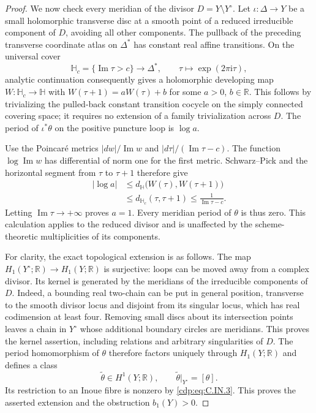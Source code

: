 \begin{proof}
We now check every meridian of the divisor
$D=Y\setminus Y^\circ$. Let $\iota:\Delta\to Y$ be a small
holomorphic transverse disc at a smooth point of a reduced
irreducible component of $D$, avoiding all other components.
The pullback of the preceding transverse coordinate atlas on
$\Delta^*$ has constant real affine transitions. On the universal
cover
\[
 \mathbb H_c=\{\operatorname{Im}\tau>c\}
 \longrightarrow\Delta^*,\qquad
 \tau\longmapsto\exp(2\pi\mathrm i\tau),
\]
analytic continuation consequently gives a holomorphic developing
map $W:\mathbb H_c\to\mathbb H$ with
$W(\tau+1)=aW(\tau)+b$ for some $a>0$, $b\in\mathbb R$.
This follows by trivializing the pulled-back constant transition
cocycle on the simply connected covering space; it requires no
extension of a family trivialization across $D$.
The period of $\iota^*\theta$ on the positive puncture loop is
$\log a$.

Use the Poincar\'e metrics
$|dw|/\operatorname{Im}w$ and
$|d\tau|/(\operatorname{Im}\tau-c)$.
The function $\log\operatorname{Im}w$ has differential of norm
one for the first metric. Schwarz--Pick and the horizontal segment
from $\tau$ to $\tau+1$ therefore give
\[
\begin{aligned}
 |\log a|
 &\le d_{\mathbb H}\bigl(W(\tau),W(\tau+1)\bigr)\\
 &\le d_{\mathbb H_c}(\tau,\tau+1)
 \le\frac{1}{\operatorname{Im}\tau-c}.
\end{aligned}
\tag{C.IN.5}\label{cdp:eq:C.IN.5}
\]
Letting $\operatorname{Im}\tau\to+\infty$ proves $a=1$.
Every meridian period of $\theta$ is thus zero. This calculation
applies to the reduced divisor and is unaffected by the
scheme-theoretic multiplicities of its components.

For clarity, the exact topological extension is as follows.
The map $H_1(Y^\circ;\mathbb R)\to H_1(Y;\mathbb R)$ is
surjective: loops can be moved away from a complex divisor.
Its kernel is generated by the meridians of the irreducible
components of $D$. Indeed, a bounding real two-chain can be put
in general position, transverse to the smooth divisor locus and
disjoint from its singular locus, which has real codimension at
least four. Removing small discs about its intersection points
leaves a chain in $Y^\circ$ whose additional boundary circles
are meridians. This proves the kernel assertion, including
relations and arbitrary singularities of $D$.
The period homomorphism of $\theta$ therefore factors uniquely
through $H_1(Y;\mathbb R)$ and defines a class
\[
 \widetilde\theta\in H^1(Y;\mathbb R),\qquad
 \widetilde\theta|_{Y^\circ}=[\theta].
\tag{C.IN.6}\label{cdp:eq:C.IN.6}
\]
Its restriction to an Inoue fibre is nonzero by \eqref{cdp:eq:C.IN.3}.
This proves the asserted extension and the obstruction $b_1(Y)>0$.


\end{proof}
